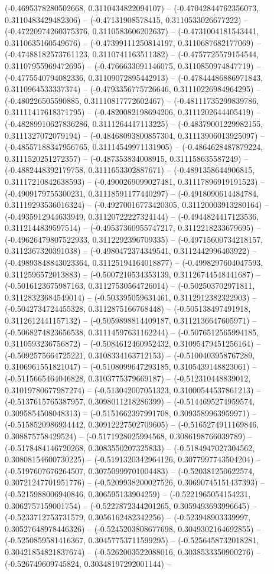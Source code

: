 (-0.4695378280502668, 0.3110434822094107) -- (-0.47042844762356073, 0.3110483429482306) -- (-0.47131908578415, 0.3110533026677222) -- (-0.47220974260375376, 0.3110583606202637) -- (-0.4731004181543441, 0.3110635160549676) -- (-0.47399111250814197, 0.3110687682177069) -- (-0.47488182573761123, 0.3110741163511382) -- (-0.4757725579154544, 0.31107955969472695) -- (-0.4766633091146075, 0.3110850974847719) -- (-0.4775540794082336, 0.31109072895442913) -- (-0.47844486886971843, 0.3110964533337374) -- (-0.4793356775726646, 0.31110226984964295) -- (-0.480226505590885, 0.31110817772602467) -- (-0.48111735299839786, 0.31111417618371795) -- (-0.4820082198694206, 0.3111202644405419) -- (-0.48289910627836286, 0.3111264417113225) -- (-0.48379001229982155, 0.3111327072079194) -- (-0.48468093800857304, 0.31113906013925097) -- (-0.48557188347956765, 0.31114549971131905) -- (-0.4864628487879224, 0.3111520251272357) -- (-0.487353834008915, 0.311158635587249) -- (-0.4882448392179758, 0.3111653302887671) -- (-0.4891358644906815, 0.31117210842638593) -- (-0.4900269099027481, 0.31117896919191523) -- (-0.4909179755300231, 0.31118591177440297) -- (-0.4918090614484784, 0.31119293536016324) -- (-0.49270016773420305, 0.31120003913280164) -- (-0.4935912944633949, 0.31120722227324144) -- (-0.4944824417123536, 0.3112144839597514) -- (-0.49537360955747217, 0.3112218233679695) -- (-0.49626479807522933, 0.3112292396709335) -- (-0.49715600734218157, 0.3112367320391038) -- (-0.4980472374349541, 0.3112442996403922) -- (-0.49893848843023364, 0.31125194164018877) -- (-0.4998297604047593, 0.3112596572013883) -- (-0.5007210534353139, 0.31126744548441687) -- (-0.5016123675987163, 0.31127530564726014) -- (-0.502503702971811, 0.31128323684549014) -- (-0.503395059631461, 0.3112912382322903) -- (-0.5042734724455328, 0.3112875166768448) -- (-0.505138497491918, 0.3112612441157132) -- (-0.5059898814409187, 0.3112136647605971) -- (-0.5068274823656538, 0.31114597631162244) -- (-0.5076512565994185, 0.3110593236756872) -- (-0.5084612460952432, 0.31095479451256164) -- (-0.5092575664725221, 0.3108334163712153) -- (-0.5100403958767289, 0.3106961551821047) -- (-0.5108099647293185, 0.3105439148823061) -- (-0.5115665464046828, 0.3103775379669187) -- (-0.512310448839012, 0.31019780677987274) -- (-0.513042007051323, 0.31000544537861213) -- (-0.5137615765387957, 0.3098011218286399) -- (-0.5144695274959574, 0.3095854508048313) -- (-0.5151662397991708, 0.3093589963959971) -- (-0.5158520986934442, 0.30912227502709605) -- (-0.5165274911169846, 0.308875758429524) -- (-0.5171928025994568, 0.3086198766039789) -- (-0.5178484146720268, 0.3083550207325833) -- (-0.5184947027304562, 0.30808154600730225) -- (-0.5191320342964126, 0.3077997743504204) -- (-0.5197607676264507, 0.30750999701004483) -- (-0.520381250622574, 0.30721247701951776) -- (-0.5209938200027526, 0.30690745151437393) -- (-0.5215988006940846, 0.306595133904259) -- (-0.5221965054154231, 0.3062757159001754) -- (-0.5227872344201265, 0.3059493693996645) -- (-0.5233712753731579, 0.3056162482342256) -- (-0.523948903339997, 0.30527648978446326) -- (-0.5245203808677698, 0.3049302164692855) -- (-0.5250859581416367, 0.30457753711599295) -- (-0.5256458732018281, 0.30421854821837674) -- (-0.5262003522088016, 0.3038533350900276) -- (-0.526749609745824, 0.30348197292001144) -- 